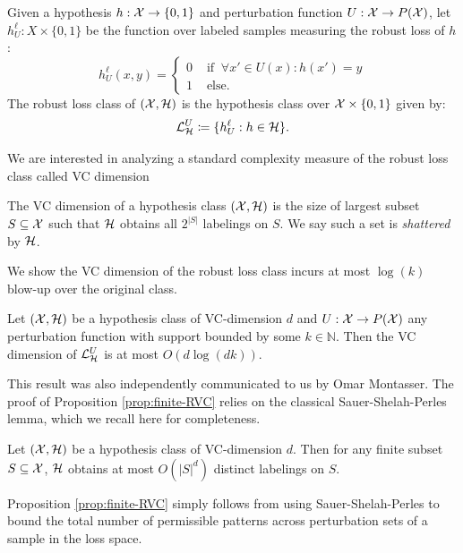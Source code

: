 \begin{defn}
Given a hypothesis $h: \mathcal X \to \{0,1\}$ and perturbation function $U:\mathcal X \to P(\mathcal X)$, let $h^\ell_U: X \times \{0,1\}$ be the function over labeled samples measuring the robust loss of $h$:
\[
h^\ell_U(x,y) = \begin{cases}
0 & \text{ if } \ \forall x' \in U(x): h(x')=y\\
1 & \text{ else.}
\end{cases}
\]
The robust loss class of $(\mathcal X,\mathcal H)$ is the hypothesis class over $\mathcal X \times \{0,1\}$ given by:
\[
\mathcal{L}^U_{\mathcal H} \coloneqq \{ h^\ell_U : h \in \mathcal H\}.
\]
\end{defn}
We are interested in analyzing a standard complexity measure of the robust loss class called VC dimension
\begin{defn}[VC Dimension]
The VC dimension of a hypothesis class $(\mathcal X,\mathcal H)$ is the size of largest subset $S \subseteq \mathcal X$ such that $\mathcal H$ obtains all $2^{|S|}$ labelings on $S$. We say such a set is \textit{shattered} by $\mathcal H$.
\end{defn}
We show the VC dimension of the robust loss class incurs at most $\log(k)$ blow-up over the original class.
\begin{prop}\label{prop:finite-RVC}
Let $(\mathcal X,\mathcal H)$ be a hypothesis class of VC-dimension $d$ and $U: \mathcal X \to P(\mathcal X)$ any perturbation function with support bounded by some $k \in \mathbb{N}$. Then the VC dimension of $\mathcal{L}^U_{\mathcal H}$ is at most $O(d\log(dk))$.
\end{prop}
This result was also independently communicated to us by Omar Montasser. The proof of Proposition \ref{prop:finite-RVC} relies on the classical Sauer-Shelah-Perles lemma, which we recall here for completeness.
\begin{lem}
Let $(\mathcal X,\mathcal H)$ be a hypothesis class of VC-dimension $d$. Then for any finite subset $S \subseteq \mathcal X$, $\mathcal H$ obtains at most $O(|S|^d)$ distinct labelings on $S$.
\end{lem}
Proposition \ref{prop:finite-RVC} simply follows from using Sauer-Shelah-Perles to bound the total number of permissible patterns across perturbation sets of a sample in the loss space.
